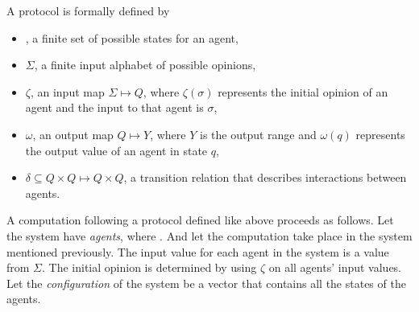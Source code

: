  A protocol is formally defined by
 \begin{itemize}
     \item {}, a finite set of possible states for an agent,
     \item $\Sigma$, a finite input alphabet of possible opinions,
     \item $\zeta$, an input map $\Sigma \mapsto Q$, where $\zeta(\sigma)$ represents the initial opinion of an agent and the input to that agent is $\sigma$,
     \item $\omega$, an output map $Q \mapsto Y$, where $Y$ is the output range and $\omega(q)$ represents the output value of an agent in state $q$,
     \item $\delta \subseteq Q \times Q \mapsto Q \times Q$, a transition relation that describes interactions between agents.
 \end{itemize}

A computation following a protocol defined like above proceeds as follows. Let the system have  \emph{agents}, where . And let the computation take place in the system mentioned previously. The input value for each agent in the system is a value from $\Sigma$. The initial opinion is determined by using $\zeta$ on all agents' input values. Let the \emph{configuration} of the system be a vector  that contains all the states of the agents. 

